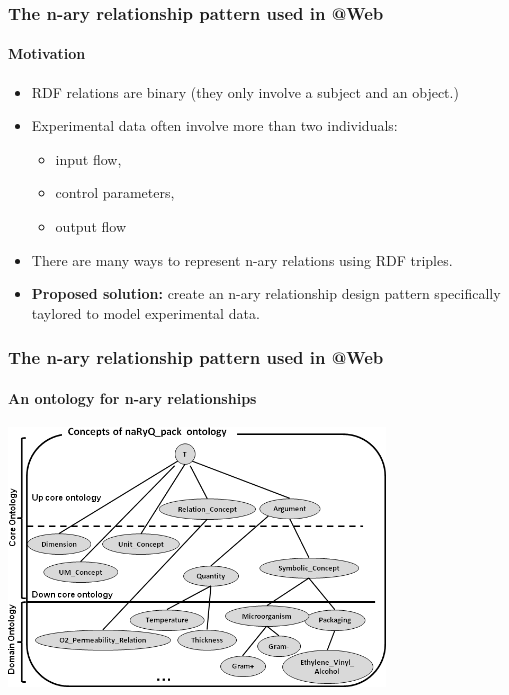 \documentclass{beamer}
\makeatletter
\newcommand{\atweb}{\textbf{@Web}\xspace}
\makeatother
\begin{document}
\begin{frame}
  \frametitle{The n-ary relationship pattern used in \atweb}
  \framesubtitle{Motivation}

  \begin{itemize}
    \item RDF relations are binary (they only involve a subject and an object.)

    \pause

    \item Experimental data often involve more than two individuals:

    \pause

    \begin{itemize}
      \item input flow,
      \item control parameters,
      \item output flow
    \end{itemize}

    \pause

    \item There are many ways to represent n-ary relations using RDF triples.

    \pause

    \item \textbf{Proposed solution:} create an n-ary relationship design
      pattern specifically taylored to model experimental data.
  \end{itemize}
\end{frame}

\begin{frame}
  \frametitle{The n-ary relationship pattern used in \atweb}
  \framesubtitle{An ontology for n-ary relationships}

  \begin{center}
    \includegraphics[width=10cm]{ontology.png}
  \end{center}
\end{frame}
\end{document}

